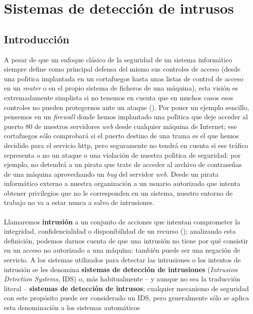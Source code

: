 \chapter{Sistemas de detecci\'on de intrusos}
\section{Introducci\'on}
A pesar de que un enfoque cl\'asico de la seguridad de un sistema inform\'atico
siempre define como principal defensa del mismo sus controles de acceso (desde
una pol\'{\i}tica implantada en un cortafuegos hasta unas listas de control de 
acceso en un {\it router} o en el propio sistema de ficheros de una m\'aquina),
esta visi\'on es extremadamente simplista si no tenemos en cuenta que en muchos
casos esos controles no pueden protegernos ante un ataque (\cite{kn:lun90}). 
Por poner un ejemplo sencillo, pensemos en un {\it firewall} donde hemos
implantado una pol\'{\i}tica que deje acceder al puerto 80 de nuestros 
servidores {\it web} desde cualquier m\'aquina de Internet; ese cortafuegos
s\'olo comprobar\'a si el puerto destino de una trama es el que hemos decidido
para el servicio {\sc http}, pero seguramente no tendr\'a en cuenta si ese
tr\'afico representa o no un ataque o una violaci\'on de nuestra pol\'{\i}tica
de seguridad: por ejemplo, no detendr\'a a un pirata que trate de acceder al
archivo de contrase\~nas de una m\'aquina aprovechando un {\it bug} del servidor
{\it web}. Desde un pirata inform\'atico externo a nuestra organizaci\'on a un 
usuario autorizado que intenta obtener privilegios que no le corresponden en un 
sistema, nuestro entorno de trabajo no va a estar nunca a salvo de 
intrusiones.\\
\\Llamaremos {\bf intrusi\'on} a un conjunto de acciones que intentan 
comprometer la integridad, confidencialidad o disponibilidad de un recurso 
(\cite{kn:hea90}); analizando esta definici\'on, podemos darnos cuenta de que
una intrusi\'on no tiene por qu\'e consistir en un acceso no autorizado a una 
m\'aquina: tambi\'en puede ser una negaci\'on de servicio. A los sistemas 
utilizados para detectar las intrusiones o los intentos de intrusi\'on
se les denomina {\bf sistemas de detecci\'on de intrusiones} ({\it Intrusion 
Detection Systems}, IDS) o, m\'as habitualmente -- y aunque no sea la 
traducci\'on literal -- {\bf sistemas de detecci\'on de intrusos}; cualquier 
mecanismo de seguridad con este prop\'osito puede ser considerado un IDS, pero
generalmente s\'olo se aplica esta denominaci\'on a los sistemas autom\'aticos
